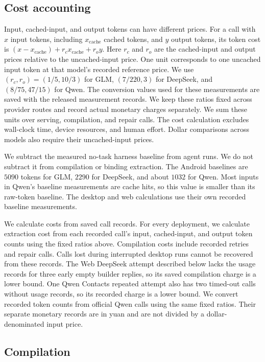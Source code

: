 \subsection{Cost accounting}\label{app:accounting}
Input, cached-input, and output tokens can have different prices.
For a call with $x$ input tokens, including $x_{\mathrm{cache}}$ cached tokens, and $y$ output tokens, its token cost is $(x-x_{\mathrm{cache}})+r_c x_{\mathrm{cache}}+r_o y$.
Here $r_c$ and $r_o$ are the cached-input and output prices relative to the uncached-input price.
One unit corresponds to one uncached input token at that model's recorded reference price.
We use $(r_c,r_o)=(1/5,10/3)$ for GLM, $(7/220,3)$ for DeepSeek, and $(8/75,47/15)$ for Qwen.
The conversion values used for these measurements are saved with the released measurement records.
We keep these ratios fixed across provider routes and record actual monetary charges separately.
We sum these units over serving, compilation, and repair calls.
The cost calculation excludes wall-clock time, device resources, and human effort.
Dollar comparisons across models also require their uncached-input prices.

We subtract the measured no-task harness baseline from agent runs.
We do not subtract it from compilation or binding extraction.
The Android baselines are $5090$ tokens for GLM, $2290$ for DeepSeek, and about $1032$ for Qwen.
Most inputs in Qwen's baseline measurements are cache hits, so this value is smaller than its raw-token baseline.
The desktop and web calculations use their own recorded baseline measurements.

We calculate costs from saved call records.
For every deployment, we calculate extraction cost from each recorded call's input, cached-input, and output token counts using the fixed ratios above.
Compilation costs include recorded retries and repair calls.
Calls lost during interrupted desktop runs cannot be recovered from these records.
The Web DeepSeek attempt described below lacks the usage records for three early empty builder replies, so its saved compilation charge is a lower bound.
One Qwen Contacts repeated attempt also has two timed-out calls without usage records, so its recorded charge is a lower bound.
We convert recorded token counts from official Qwen calls using the same fixed ratios.
Their separate monetary records are in yuan and are not divided by a dollar-denominated input price.

\subsection{Compilation}
\label{sec:protocol}

